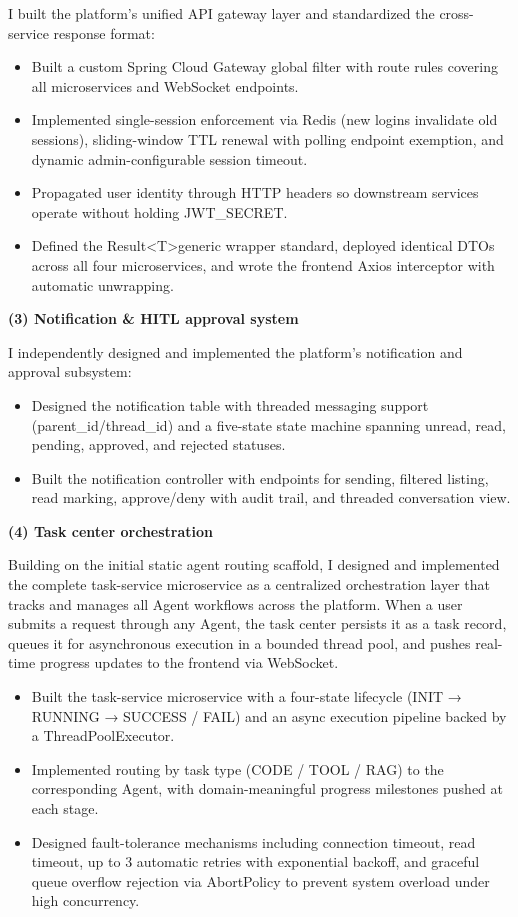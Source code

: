 I built the platform's unified API gateway layer and standardized the cross-service response format:

\begin{itemize}
  \item Built a custom Spring Cloud Gateway global filter with route rules covering all microservices and WebSocket endpoints.
  \item Implemented single-session enforcement via Redis (new logins invalidate old sessions), sliding-window TTL renewal with polling endpoint exemption, and dynamic admin-configurable session timeout.
  \item Propagated user identity through HTTP headers so downstream services operate without holding JWT\_SECRET.
  \item Defined the Result\textless T\textgreater generic wrapper standard, deployed identical DTOs across all four microservices, and wrote the frontend Axios interceptor with automatic unwrapping.
\end{itemize}

\textbf{(3) Notification \& HITL approval system}

I independently designed and implemented the platform's notification and approval subsystem:

\begin{itemize}
  \item Designed the notification table with threaded messaging support (parent\_id/thread\_id) and a five-state state machine spanning unread, read, pending, approved, and rejected statuses.
  \item Built the notification controller with endpoints for sending, filtered listing, read marking, approve/deny with audit trail, and threaded conversation view.
\end{itemize}

\textbf{(4) Task center orchestration}

Building on the initial static agent routing scaffold, I designed and implemented the complete task-service microservice as a centralized orchestration layer that tracks and manages all Agent workflows across the platform. When a user submits a request through any Agent, the task center persists it as a task record, queues it for asynchronous execution in a bounded thread pool, and pushes real-time progress updates to the frontend via WebSocket.

\begin{itemize}
  \item Built the task-service microservice with a four-state lifecycle (INIT → RUNNING → SUCCESS / FAIL) and an async execution pipeline backed by a ThreadPoolExecutor.
  \item Implemented routing by task type (CODE / TOOL / RAG) to the corresponding Agent, with domain-meaningful progress milestones pushed at each stage.
  \item Designed fault-tolerance mechanisms including connection timeout, read timeout, up to 3 automatic retries with exponential backoff, and graceful queue overflow rejection via AbortPolicy to prevent system overload under high concurrency.
\end{itemize}

